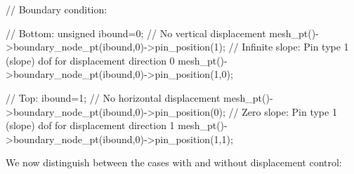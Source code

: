 \begin{DoxyCodeInclude}
 \textcolor{comment}{// Boundary condition: }

 \textcolor{comment}{// Bottom: }
 \textcolor{keywordtype}{unsigned} ibound=0;
 \textcolor{comment}{// No vertical displacement}
 mesh\_pt()->boundary\_node\_pt(ibound,0)->pin\_position(1); 
 \textcolor{comment}{// Infinite slope: Pin type 1 (slope) dof for displacement direction 0 }
 mesh\_pt()->boundary\_node\_pt(ibound,0)->pin\_position(1,0);

 \textcolor{comment}{// Top: }
 ibound=1;
  \textcolor{comment}{// No horizontal displacement}
 mesh\_pt()->boundary\_node\_pt(ibound,0)->pin\_position(0); 
 \textcolor{comment}{// Zero slope: Pin type 1 (slope) dof for displacement direction 1}
 mesh\_pt()->boundary\_node\_pt(ibound,0)->pin\_position(1,1);

\end{DoxyCodeInclude}


We now distinguish between the cases with and without displacement control\+:


